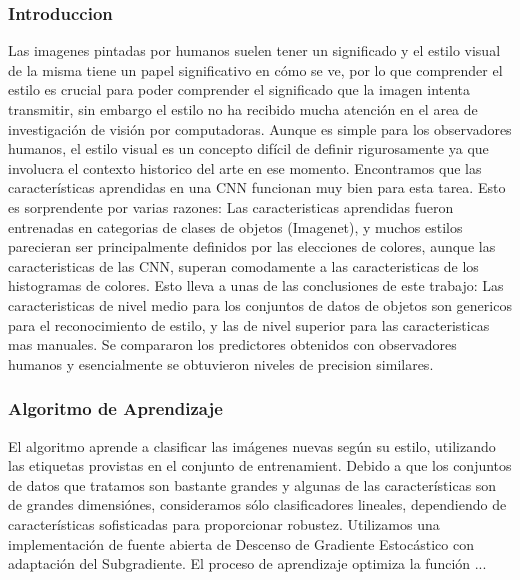 \documentclass[a4paper,10pt]{article}
\begin{document}
    \subsubsection{Introduccion}
      Las imagenes pintadas por humanos suelen tener un significado y el estilo visual de la misma tiene un papel significativo en cómo se ve, por lo que comprender
      el estilo es crucial para poder comprender el significado que la imagen intenta transmitir, sin embargo el estilo no ha recibido  mucha atención en el area de investigación de visión por computadoras. 
      Aunque es simple para los observadores humanos, el estilo visual es un concepto difícil de definir rigurosamente ya que involucra el contexto historico del arte en ese momento.
      Encontramos que las características aprendidas en una CNN funcionan muy bien para esta tarea. Esto es sorprendente por varias razones: Las caracteristicas aprendidas
      fueron entrenadas en categorias de clases de objetos (Imagenet), y muchos estilos parecieran ser principalmente definidos por las elecciones de colores, aunque
      las caracteristicas de las CNN, superan comodamente a las caracteristicas de los histogramas de colores. Esto lleva a unas de las conclusiones de este trabajo:
      Las caracteristicas de nivel medio para los conjuntos de datos de objetos son genericos para el reconocimiento de estilo, y las de nivel superior para las caracteristicas
      mas manuales.
      Se compararon los predictores obtenidos con observadores humanos y esencialmente se obtuvieron niveles de precision similares.
    \subsubsection{Algoritmo de Aprendizaje}
      El algoritmo aprende a clasificar las imágenes nuevas según su estilo, utilizando las etiquetas provistas en el conjunto de entrenamient.
      Debido a que los conjuntos de datos que tratamos son bastante grandes y algunas de las características son de grandes dimensiónes, consideramos sólo clasificadores lineales, 
      dependiendo de características sofisticadas para proporcionar robustez. Utilizamos una implementación de fuente abierta de Descenso de Gradiente Estocástico con adaptación
      del Subgradiente. El proceso de aprendizaje optimiza la función ...
\end{document}
